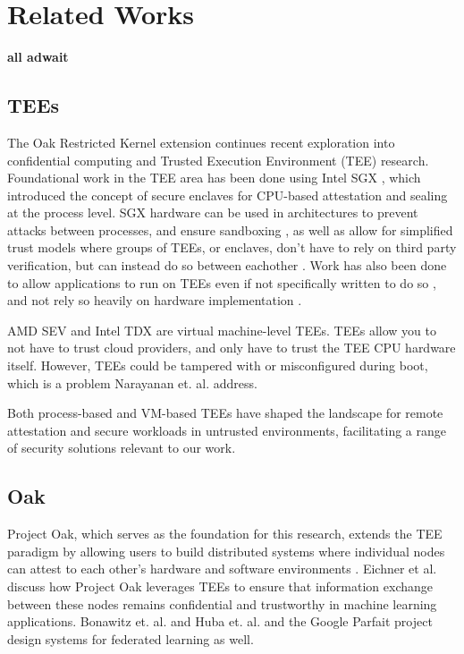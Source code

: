 \section{Related Works}
\label{sec:relwork}

\textbf{all adwait}


\subsection{TEEs}

The Oak Restricted Kernel extension continues recent exploration into confidential computing and Trusted Execution Environment (TEE) research.
Foundational work in the TEE area has been done using Intel SGX \cite{anati_innovative_nodate}, which introduced the concept of secure enclaves for CPU-based attestation and sealing at the process level.
SGX hardware can be used in architectures to prevent attacks between processes, and ensure sandboxing \cite{england_foundation_nodate},
as well as allow for simplified trust models where groups of TEEs, or enclaves, don't have to rely on third party verification, but can instead do so between eachother \cite{chen_mage_nodate}. Work has also been done to allow applications to run on TEEs even if not specifically written to do so \cite{tsai_graphene-sgx_nodate}, and not rely so heavily on hardware implementation \cite{ahmad_extensible_nodate}.

AMD SEV \cite{ahmad_veil_2023} and Intel TDX \cite{cheng_intel_2024} are virtual machine-level TEEs.
TEEs allow you to not have to trust cloud providers, and only have to trust the TEE CPU hardware itself. However, TEEs could be tampered with or misconfigured during boot, which is a problem 
Narayanan et. al. address. \cite{narayanan_remote_2023}

Both process-based and VM-based TEEs have shaped the landscape for remote attestation and secure workloads in untrusted environments, facilitating a range of security solutions relevant to our work.

\subsection{Oak}

Project Oak, which serves as the foundation for this research, extends the TEE paradigm by allowing users to build distributed systems where individual nodes can attest to each other's hardware and software environments \cite{noauthor_project-oakoak_nodate}. Eichner et al. \cite{eichner_confidential_2024} discuss how Project Oak leverages TEEs to ensure that information exchange between these nodes remains confidential and trustworthy in machine learning applications.
Bonawitz et. al. \cite{bonawitz_towards_2019} and Huba et. al. \cite{huba_papaya_2022} and the Google Parfait project \cite{noauthor_google-parfaitfederated-compute_2024} design systems for federated learning as well.

